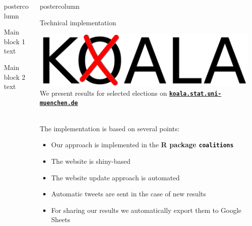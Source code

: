 \documentclass[final,hyperref={pdfpagelabels=false}]{beamer}
\newcommand{\bfBlue}[1]{\textcolor{koaladarkestblue}{\textbf{#1}}}
\newcommand*\circled[1]{\tikz[baseline=(char.base)]{
\node[shape=circle,draw,inner sep=2pt] (char) {#1};}}
\newlength{\columnheight}
\begin{document}
\begin{frame}
\begin{columns}
\begin{column}{1\textwidth}
\begin{columns}[T]
\begin{column}{.484\textwidth}
\begin{beamercolorbox}[center,wd=\textwidth]{postercolumn}
\begin{minipage}[T]{.95\textwidth}  %

\begin{block}{\footnotesize \circled{1} Main block 1}
text
\end{block}


\begin{block}{\footnotesize \circled{2} Main block 2}
text
\end{block}



\end{minipage}
\end{beamercolorbox}
\end{column}

\begin{column}{.484\textwidth}
\begin{beamercolorbox}[center,wd=\textwidth]{postercolumn}
\begin{minipage}[T]{.95\textwidth}  %


\begin{block}{\footnotesize \circled{3} Technical implementation}
\begin{center}
\includegraphics[height=5ex]{figures/Koala_Logo_ohneSchrift}
\\[2ex]
We present results for selected elections on
\bfBlue{\texttt{\href{test}{koala.stat.uni-muenchen.de}}}
\end{center}
\\[2ex]
The implementation is based on several points:
\begin{itemize}
  \item Our approach is implemented in the \bfBlue{R package \texttt{coalitions}}   \item The website is shiny-based
  \item The website update approach is automated
  \item Automatic tweets are sent in the case of new results
  \item For sharing our results we automatically export them to Google Sheets
\end{itemize}


\end{block}
\end{minipage}
\end{beamercolorbox}
\end{column}
\end{columns}
\end{column}
\end{columns}
\end{frame}
\end{document}
